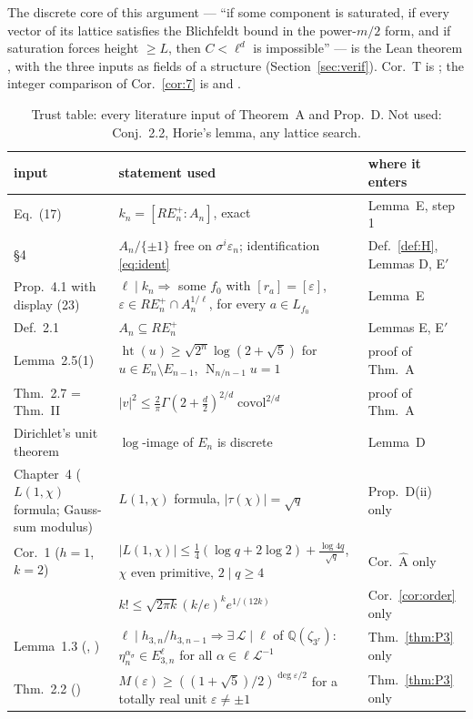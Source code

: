 \documentclass[11pt]{amsart}
\theoremstyle{remark}\newtheorem{remark}[theorem]{Remark}
\theoremstyle{definition}\newtheorem{definition}[theorem]{Definition}
\theoremstyle{definition}\newtheorem{algorithm}[theorem]{Algorithm}
\newcommand{\Q}{\mathbb{Q}}\newcommand{\Z}{\mathbb{Z}}\newcommand{\R}{\mathbb{R}}\newcommand{\F}{\mathbb{F}}
\newcommand{\RE}{RE^{+}_n}\newcommand{\ord}{\operatorname{ord}}\newcommand{\hgt}{\operatorname{ht}}
\newcommand{\Nr}{\operatorname{N}_{n/n-1}}\newcommand{\covol}{\operatorname{covol}}
\begin{document}
The discrete core of this argument --- ``if some component is saturated, if every vector of its lattice satisfies the Blichfeldt bound in the power-$m/2$ form, and if saturation forces height $\ge L$, then $C<\ell^d$ is impossible'' --- is the Lean theorem , with the three inputs as fields of a structure (Section~\ref{sec:verif}). Cor.~T is ; the integer comparison of Cor.~\ref{cor:7} is  and .

\begin{table}[h]\small
\begin{tabular}{@{}p{3.4cm}p{5.0cm}p{3.3cm}@{}}\toprule
input & statement used & where it enters\\ \midrule
\cite{KY} Eq.~(17) & $k_n=[\RE:A_n]$, exact & Lemma~E, step 1\\
\cite{KY} \S4 & $A_n/\{\pm1\}$ free on $\sigma^i\varepsilon_n$; identification \eqref{eq:ident} & Def.~\ref{def:H}, Lemmas D, E$'$\\
\cite{KY} Prop.~4.1 with display (23) & $\ell\mid k_n\Rightarrow$ some $f_0$ with $[r_a]=[\varepsilon]$, $\varepsilon\in\RE\cap A_n^{1/\ell}$, for every $a\in L_{f_0}$ & Lemma~E\\
\cite{KY} Def.~2.1 & $A_n\subseteq\RE$ & Lemmas E, E$'$\\
\cite{MO16} Lemma~2.5(1) & $\hgt(u)\ge\sqrt{2^n}\log(2+\sqrt5)$ for $u\in E_n\setminus E_{n-1}$, $\Nr u=1$ & proof of Thm.~A\\
\cite{MO16} Thm.~2.7 = \cite{Bl14} Thm.~II & $|v|^2\le\frac2\pi\Gamma(2+\frac d2)^{2/d}\covol^{2/d}$ & proof of Thm.~A\\
Dirichlet's unit theorem & $\log$-image of $E_n$ is discrete & Lemma~D\\
\cite{Wash} Chapter~4 ($L(1,\chi)$ formula; Gauss-sum modulus) & $L(1,\chi)$ formula, $|\tau(\chi)|=\sqrt q$ & Prop.~D(ii) only\\
\cite{Ram04} Cor.~1 ($h=1$, $k=2$) & $|L(1,\chi)|\le\frac14(\log q+2\log2)+\frac{\log 4q}{\sqrt q}$, $\chi$ even primitive, $2\mid q\ge4$ & Cor.~$\widehat{\mathrm A}$ only\\
\cite{Rob55} & $k!\le\sqrt{2\pi k}(k/e)^ke^{1/(12k)}$ & Cor.~\ref{cor:order} only\\
\cite{MO13} Lemma~1.3 (\cite{Ho05b}, \cite{Ho02}) & $\ell\mid h_{3,n}/h_{3,n-1}\Rightarrow\exists\,\mathcal L\mid\ell$ of $\Q(\zeta_{3^r})$: $\eta_n^{\alpha_\sigma}\in E_{3,n}^{\ell}$ for all $\alpha\in\ell\mathcal L^{-1}$ & Thm.~\ref{thm:P3} only\\
\cite{MO13} Thm.~2.2 (\cite{Sch73}) & $M(\varepsilon)\ge((1+\sqrt5)/2)^{\deg\varepsilon/2}$ for a totally real unit $\varepsilon\ne\pm1$ & Thm.~\ref{thm:P3} only\\
\bottomrule\end{tabular}
\caption{Trust table: every literature input of Theorem~A and Prop.~D. Not used: \cite{KY} Conj.~2.2, Horie's lemma, any lattice search.}\label{tab:trust}
\end{table}
\end{document}
